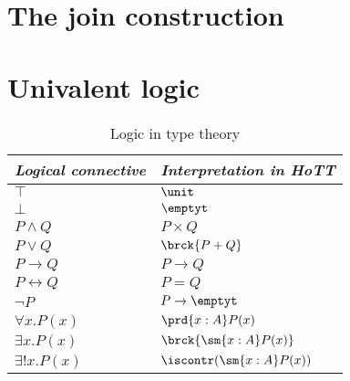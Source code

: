 \section{The join construction}
\section{Univalent logic}
\begin{table}
\caption{Logic in type theory}
\begin{center}
\begin{tabular}{ll}
\toprule
\emph{Logical connective} & \emph{Interpretation in HoTT} \\
\midrule
$\top$ & $\unit$ \\
$\bot$ & $\emptyt$ \\
$P\land Q$ & $P\times Q$ \\
$P\lor Q$ & $\brck{P+Q}$ \\
$P\to Q$ & $P\to Q$ \\
$P\leftrightarrow Q$ & $P=Q$ \\
$\neg P$ & $P\to\emptyt$ \\
$\forall x.P(x)$ & $\prd{x:A}P(x)$ \\
$\exists x.P(x)$ & $\brck{\sm{x:A}P(x)}$ \\
$\exists! x.P(x)$ & $\iscontr(\sm{x:A}P(x))$ \\
\bottomrule
\end{tabular}
\end{center}
\end{table}

